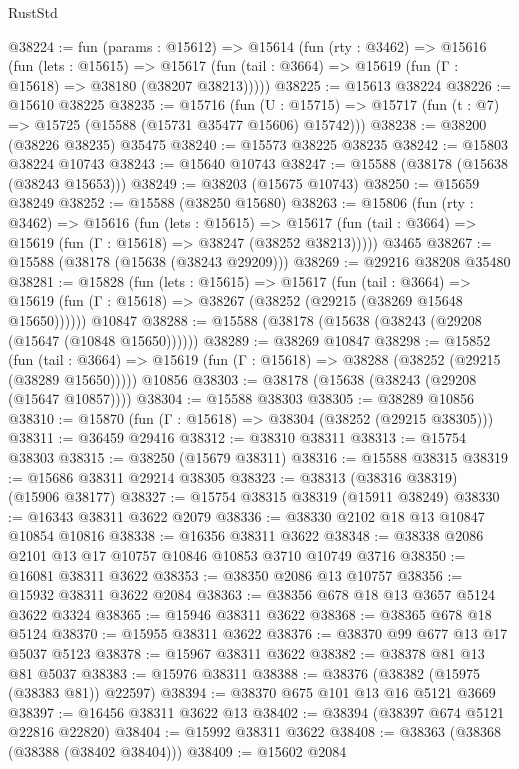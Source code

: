 \begin{lexlean}{RustStd}
\begin{coremodule}
@38224 := fun (params : @15612) =>
  @15614
    (fun (rty : @3462) =>
    @15616
      (fun (lets : @15615) =>
      @15617 (fun (tail : @3664) => @15619 (fun (Γ : @15618) => @38180 (@38207 @38213)))))
@38225 := @15613 @38224
@38226 := @15610 @38225
@38235 := @15716
    (fun (U : @15715) => @15717 (fun (t : @7) => @15725 (@15588 (@15731 @35477 @15606) @15742)))
@38238 := @38200 (@38226 @38235) @35475
@38240 := @15573 @38225 @38235
@38242 := @15803 @38224 @10743
@38243 := @15640 @10743
@38247 := @15588 (@38178 (@15638 (@38243 @15653)))
@38249 := @38203 (@15675 @10743)
@38250 := @15659 @38249
@38252 := @15588 (@38250 @15680)
@38263 := @15806
    (fun (rty : @3462) =>
    @15616
      (fun (lets : @15615) =>
      @15617 (fun (tail : @3664) => @15619 (fun (Γ : @15618) => @38247 (@38252 @38213)))))
    @3465
@38267 := @15588 (@38178 (@15638 (@38243 @29209)))
@38269 := @29216 @38208 @35480
@38281 := @15828
    (fun (lets : @15615) =>
    @15617
      (fun (tail : @3664) =>
      @15619 (fun (Γ : @15618) => @38267 (@38252 (@29215 (@38269 @15648 @15650))))))
    @10847
@38288 := @15588 (@38178 (@15638 (@38243 (@29208 (@15647 (@10848 @15650))))))
@38289 := @38269 @10847
@38298 := @15852
    (fun (tail : @3664) => @15619 (fun (Γ : @15618) => @38288 (@38252 (@29215 (@38289 @15650)))))
    @10856
@38303 := @38178 (@15638 (@38243 (@29208 (@15647 @10857))))
@38304 := @15588 @38303
@38305 := @38289 @10856
@38310 := @15870 (fun (Γ : @15618) => @38304 (@38252 (@29215 @38305)))
@38311 := @36459 @29416
@38312 := @38310 @38311
@38313 := @15754 @38303
@38315 := @38250 (@15679 @38311)
@38316 := @15588 @38315
@38319 := @15686 @38311 @29214 @38305
@38323 := @38313 (@38316 @38319) (@15906 @38177)
@38327 := @15754 @38315 @38319 (@15911 @38249)
@38330 := @16343 @38311 @3622 @2079
@38336 := @38330 @2102 @18 @13 @10847 @10854 @10816
@38338 := @16356 @38311 @3622
@38348 := @38338 @2086 @2101 @13 @17 @10757 @10846 @10853 @3710 @10749 @3716
@38350 := @16081 @38311 @3622
@38353 := @38350 @2086 @13 @10757
@38356 := @15932 @38311 @3622 @2084
@38363 := @38356 @678 @18 @13 @3657 @5124 @3622 @3324
@38365 := @15946 @38311 @3622
@38368 := @38365 @678 @18 @5124
@38370 := @15955 @38311 @3622
@38376 := @38370 @99 @677 @13 @17 @5037 @5123
@38378 := @15967 @38311 @3622
@38382 := @38378 @81 @13 @81 @5037
@38383 := @15976 @38311
@38388 := @38376 (@38382 (@15975 (@38383 @81)) @22597)
@38394 := @38370 @675 @101 @13 @16 @5121 @3669
@38397 := @16456 @38311 @3622 @13
@38402 := @38394 (@38397 @674 @5121 @22816 @22820)
@38404 := @15992 @38311 @3622
@38408 := @38363 (@38368 (@38388 (@38402 @38404)))
@38409 := @15602 @2084

\end{coremodule}
\end{lexlean}
